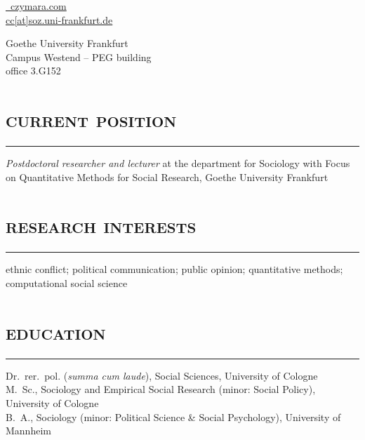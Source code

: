\documentclass[11pt, a4paper]{article}
\title{}
\newcommand{\years}[1]{\marginnote{~~#1}}
\begin{document}
\author{\huge \textsc{Dr. Christian S. Czymara}}
\date{}
\maketitle
\begin{minipage}{0.5\textwidth}
\href{https://czymara.com}{\faLaptop~czymara.com}\\
\href{mailto:cc@soz.uni-frankfurt.de}{ cc[at]soz.uni-frankfurt.de}\\
\href{https://scholar.google.de/citations?user=khPqHmgAAAAJ}{\faGoogle} \href{https://github.com/czymara/}{\faGithub} \href{https://methodenderqu-ujz7851.slack.com/team/U010X1DBKMG}{\textcolor[rgb]{0,0,1}{\faSlack}} \href{https://twitter.com/cczymara}{\faTwitter}
\end{minipage}
\begin{minipage}{0.5\textwidth}
\begin{flushright}
Goethe University Frankfurt\\
Campus Westend -- PEG building\\
office 3.G152
\end{flushright}
\end{minipage}
\section*{\textsc{current position}}
\vskip-20pt{\noindent\rule{\textwidth}{1pt}}
\years{since 05/18}\textit{Postdoctoral researcher and lecturer} at the department for Sociology with Focus on Quantitative Methods for Social Research, Goethe University Frankfurt
\section*{\textsc{research interests}}
\vskip-20pt{\noindent\rule{\textwidth}{1pt}}
ethnic conflict; political communication; public opinion; quantitative methods; computational social science
\section*{\textsc{education}}
\vskip-20pt{\noindent\rule{\textwidth}{1pt}}
\noindent
\years{12/18}Dr.~rer.~pol. (\textit{summa cum laude}), Social Sciences, University of Cologne\\[1em]
\years{08/15}M.~Sc., Sociology and Empirical Social Research (minor: Social Policy), University of Cologne\\[1em]
\years{06/12}B.~A., Sociology (minor: Political Science \& Social Psychology), University of Mannheim
\end{document}
